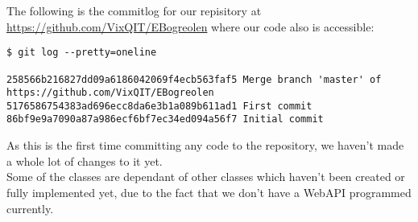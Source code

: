\documentclass[12pt]{article}
\begin{document}
The following is the commitlog for our repisitory at \url{https://github.com/VixQIT/EBogreolen} where our code also is accessible:
\begin{verbatim}
$ git log --pretty=oneline

258566b216827dd09a6186042069f4ecb563faf5 Merge branch 'master' of 
https://github.com/VixQIT/EBogreolen
5176586754383ad696ecc8da6e3b1a089b611ad1 First commit
86bf9e9a7090a87a986ecf6bf7ec34ed094a56f7 Initial commit
\end{verbatim}
As this is the first time committing any code to the repository, we haven't made a whole lot of changes to it yet.\\
Some of the classes are dependant of other classes which haven't been created or fully implemented yet, due to the fact that we don't have a WebAPI programmed currently.
\end{document}
